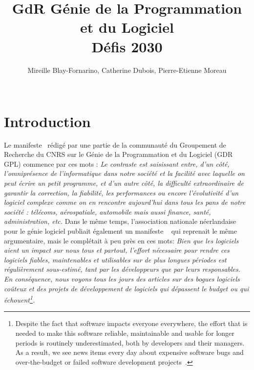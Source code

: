 \documentclass[11pt]{article}
\title{GdR Génie de la Programmation et du Logiciel\\ 
Défis 2030}
\author{Mireille Blay-Fornarino, Catherine Dubois, Pierre-Etienne Moreau\\
\\
}
\begin{document}
\maketitle

\section{Introduction}

Le manifeste~\cite{manifeste} rédigé par une partie de la communauté du Groupement de Recherche du CNRS sur le Génie de la Programmation et du Logiciel (GDR GPL) commence par ces mots : \emph{Le contraste est saisissant entre, d’un côté, l’omniprésence de l’informatique dans notre
société et la facilité avec laquelle on peut écrire un petit programme, et d’un autre côté, la difficulté extraordinaire de garantir la correction, la fiabilité, les performances ou encore
l’évolutivité d’un logiciel complexe comme on en rencontre aujourd’hui dans tous les pans
de notre société : télécoms, aérospatiale, automobile mais aussi finance, santé,
administration, etc. }
Dans le même temps, l'association nationale néerlandaise pour le génie logiciel publiait également un manifeste ~\cite{Nederland2019} qui reprenait le même argumentaire, mais le complétait à peu près en ces mots:  \emph{Bien que les logiciels aient un impact sur nous tous et partout, l'effort nécessaire pour rendre ces logiciels fiables, maintenables et utilisables sur de plus longues périodes est régulièrement sous-estimé, tant par les développeurs que par leurs responsables. En conséquence, nous voyons tous les jours des articles sur des bogues logiciels coûteux et des projets de développement de logiciels qui dépassent le budget ou qui échouent\footnote{Despite the fact that software impacts everyone everywhere, the effort that is needed to make this software reliable,
maintainable and usable for longer periods is routinely underestimated, both by developers and their managers. As a result,
we see news items every day about expensive software bugs and over-the-budget or failed software development projects~\cite{Nederland2019}.}.}
\end{document}
